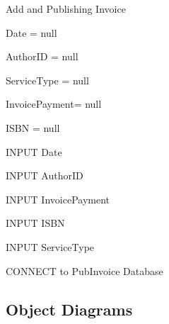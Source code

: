 \begin{algorithm}[H]
    \caption{Add and Publishing Invoice}
\begin{algorithmic}[1]



Date = null

AuthorID = null

ServiceType = null

InvoicePayment= null

ISBN = null


    INPUT Date

\EndWhile


    INPUT AuthorID

\EndWhile


    INPUT InvoicePayment

\EndWhile


    INPUT ISBN

\EndWhile


    INPUT ServiceType

\EndWhile

    
    CONNECT to PubInvoice Database
    
\EndIf

\EndFunction
\end{algorithmic}
\end{algorithm}

\subsection{Object Diagrams}

